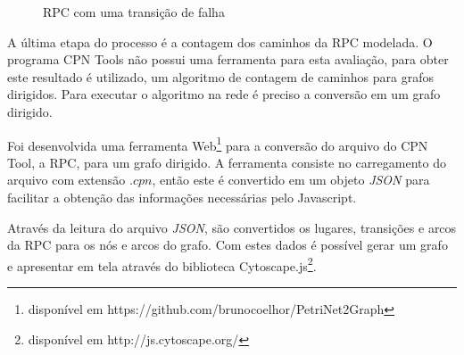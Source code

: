 \begin{figure}[ht]
  \centering
  \caption{RPC com uma transição de falha}
  \label{fig:RPC-3}
\end{figure}

A última etapa do processo é a contagem dos caminhos da RPC modelada. O programa CPN Tools não possui uma ferramenta para esta avaliação, para obter este resultado é utilizado, um algoritmo de contagem de caminhos para grafos dirigidos. Para executar o algoritmo na rede é preciso a conversão em um grafo dirigido. 

Foi desenvolvida uma ferramenta Web\footnote[1]{disponível em https://github.com/brunocoelhor/PetriNet2Graph} para a conversão do arquivo do CPN Tool, a RPC, para um grafo dirigido. A ferramenta consiste no carregamento do arquivo com extensão $.cpn$, então este é convertido em um objeto \textit{JSON} para facilitar a obtenção das informações necessárias pelo Javascript.

Através da leitura do arquivo \textit{JSON}, são convertidos os lugares, transições e arcos da RPC para os nós e arcos do grafo. Com estes dados é possível gerar um grafo e apresentar em tela através do biblioteca Cytoscape.js\footnote[2]{disponível em http://js.cytoscape.org/}.

